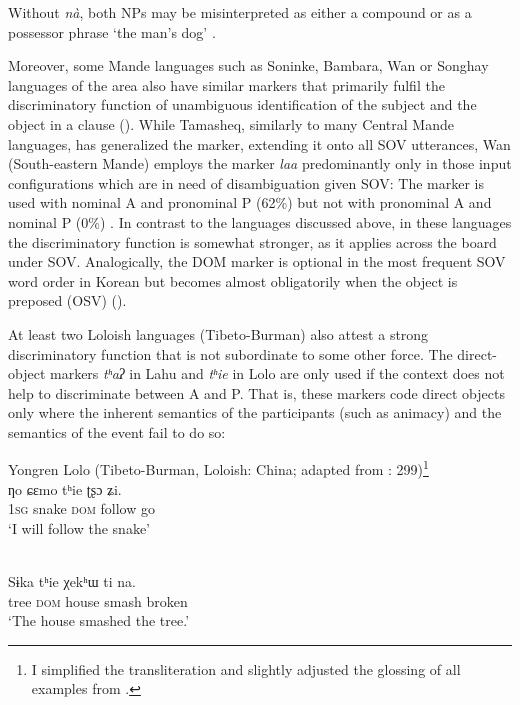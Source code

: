 \documentclass[output=paper]{langsci/langscibook}
\begin{document}
Without \textit{nà}, both NPs may be misinterpreted as either a compound or as a possessor phrase ‘the man’s dog’ \citep[91]{Heath2007}.

Moreover, some Mande languages such as Soninke, Bambara, Wan or Songhay languages of the area also have similar markers that primarily fulfil the discriminatory function of unambiguous identification of the subject and the object in a clause (\citealt{Heath2007,CreisselsDiagne2013,Nikitina2018}). While Tamasheq, similarly to many Central Mande languages, has generalized the marker, extending it onto all SOV utterances, Wan (South-eastern Mande) employs the marker \textit{laa} predominantly only in those input configurations which are in need of disambiguation given SOV: The marker is used with nominal A and pronominal P (62\%) but not with pronominal A and nominal P (0\%) \citep[202]{Nikitina2018}. In contrast to the languages discussed above, in these languages the discriminatory function is somewhat stronger, as it applies across the board under SOV. Analogically, the DOM marker is optional in the most frequent SOV word order in Korean but becomes almost obligatorily when the object is preposed (OSV) (\citealt{AhnCho2007}).

At least two Loloish languages (Tibeto-Burman) also attest a strong discriminatory function that is not subordinate to some other force. The direct-object markers \textit{tʰ}\textit{aʔ} in Lahu and \textit{tʰ}\textit{ie} in Lolo are only used if the context does not help to discriminate between A and P. That is, these markers code direct objects only where the inherent semantics of the participants (such as animacy) and the semantics of the event fail to do so:

\ea\label{ex:serzant:25}
Yongren Lolo (Tibeto-Burman, Loloish: China; adapted from \citealt{Gerner2008}: 299)\footnote{I simplified the transliteration and slightly adjusted the glossing of all examples from \citet{Gerner2008}.}\\
\gll ƞo   ɕεmo   tʰie   ʈʂɔ   ʑi.\\
     1\textsc{sg}  snake  \textsc{dom}  follow  go\\
\glt ‘I will follow the snake’
\z

\ea\label{ex:serzant:26}
\\
\gll Sɨka   tʰie   χekʰɯ   ti   na.\\
     tree  \textsc{dom}  house  smash  broken\\
\glt ‘The house smashed the tree.’
\z
\end{document}
